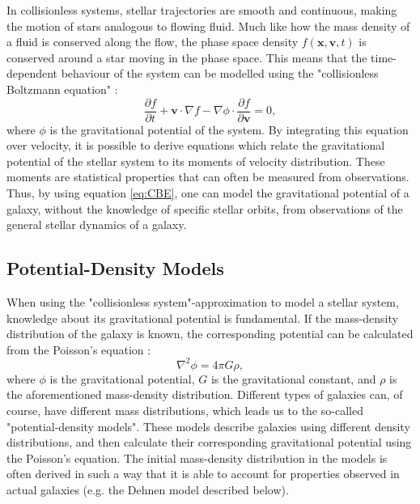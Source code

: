 \documentclass[english, twoside]{HYgradu}
\begin{document}
In collisionless systems, stellar trajectories are smooth and continuous, making the motion of stars analogous to flowing fluid. Much like how the mass density of a fluid is conserved along the flow, the phase space density $f(\mathbf{x}, \mathbf{v}, t)$ is conserved around a star moving in the phase space. This means that the time-dependent behaviour of the system can be modelled using the "collisionless Boltzmann equation" \citep{MerrittBook}:
\begin{equation}
\frac{\partial f}{\partial t} + \mathbf{v} \cdot \nabla f - \nabla \phi \cdot \frac{\partial f}{\partial \mathbf{v}} = 0, \label{eq:CBE}
\end{equation}
where $\phi$ is the gravitational potential of the system. By integrating this equation over velocity, it is possible to derive equations which relate the gravitational potential of the stellar system to its moments of velocity distribution. These moments are statistical properties that can often be measured from observations. Thus, by using equation \ref{eq:CBE}, one can model the gravitational potential of a galaxy, without the knowledge of specific stellar orbits, from observations of the general stellar dynamics of a galaxy.
  
\subsection{Potential-Density Models} \label{section:potential_density}

When using the "collisionless system"-approximation to model a stellar system, knowledge about its gravitational potential is fundamental. If the mass-density distribution of the galaxy is known, the corresponding potential can be calculated from the Poisson's equation \citep{BinneyTremaine}:
\begin{equation}
\nabla^2 \phi = 4 \pi G \rho, \label{eq:poisson}
\end{equation}
where $\phi$ is the gravitational potential, $G$ is the gravitational constant, and $\rho$ is the aforementioned mass-density distribution. Different types of galaxies can, of course, have different mass distributions, which leads us to the so-called "potential-density models". These models describe galaxies using different density distributions, and then calculate their corresponding gravitational potential using the Poisson's equation. The initial mass-density distribution in the models is often derived in such a way that it is able to account for properties observed in actual galaxies (e.g. the Dehnen model described below). 
\end{document}
